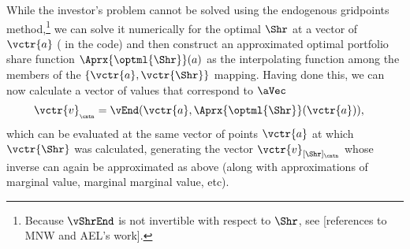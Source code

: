 \documentclass[\econtexRoot/SolvingMicroDSOPs]{subfiles}
\begin{document}
While the investor's problem cannot be solved using the endogenous gridpoints method,\footnote{Because $\vShrEnd$ is not invertible with respect to $\Shr$, see [references to MNW and AEL's work].} we can solve it numerically for the optimal $\Shr$ at a vector of $\vctr{a}$ ({\aVecCode} in the code)  and then construct an approximated optimal portfolio share function $\Aprx{\optml{\Shr}}(a)$ as the interpolating function among the members of the $\{\vctr{a},\vctr{\Shr}\}$ mapping.  Having done this, we can now calculate a vector of values that correspond to $\aVec$
\begin{equation}\begin{gathered}\begin{aligned}
      \vctr{{v}}_{_\cntn}  & = \vEnd(\vctr{a},\Aprx{\optml{\Shr}}(\vctr{a})), \label{eq:vShrEnd}
    \end{aligned}\end{gathered}\end{equation}
which can be evaluated at the same vector of points $\vctr{a}$ at which $\vctr{\Shr}$ was calculated, generating the vector $\vctr{{v}}_{[\Shr]{_\cntn}}$ whose inverse can again be approximated as above (along with approximations of marginal value, marginal marginal value, etc).%
\end{document}
